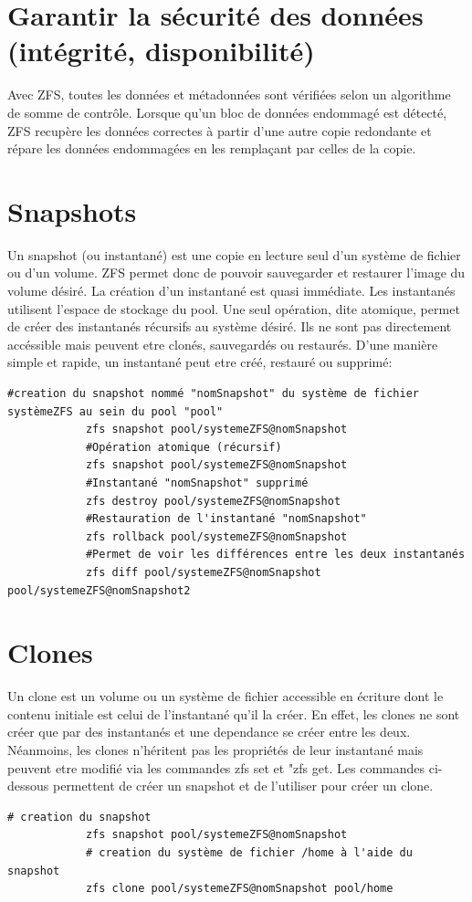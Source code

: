 \documentclass[a4paper]{report}
\begin{document}
	\section{Garantir la sécurité des données (intégrité, disponibilité)}
		Avec ZFS, toutes les données et métadonnées sont vérifiées selon un algorithme de somme de contrôle. Lorsque qu'un bloc de données endommagé est détecté, ZFS recupère les données correctes à partir d'une autre copie redondante et répare les données endommagées en les remplaçant par celles de la copie.
	\section{Snapshots}
		Un snapshot (ou instantané) est une copie en lecture seul d'un système de fichier ou d'un volume. ZFS permet donc de pouvoir sauvegarder et restaurer l'image du volume désiré. La création d'un instantané est quasi immédiate. Les instantanés utilisent l'espace de stockage du pool. Une seul opération, dite atomique, permet de créer des instantanés récursifs au système désiré. Ils ne sont pas directement accéssible mais peuvent etre clonés, sauvegardés ou restaurés. D'une manière simple et rapide, un instantané peut etre créé, restauré ou supprimé:
		\begin{lstlisting}[language=ksh,texcl]
			#creation du snapshot nommé "nomSnapshot" du système de fichier systèmeZFS au sein du pool "pool"
			zfs snapshot pool/systemeZFS@nomSnapshot
			#Opération atomique (récursif)
			zfs snapshot pool/systemeZFS@nomSnapshot 
			#Instantané "nomSnapshot" supprimé
			zfs destroy pool/systemeZFS@nomSnapshot 
			#Restauration de l'instantané "nomSnapshot"
			zfs rollback pool/systemeZFS@nomSnapshot 
			#Permet de voir les différences entre les deux instantanés
			zfs diff pool/systemeZFS@nomSnapshot pool/systemeZFS@nomSnapshot2 
		\end{lstlisting}
	\section{Clones}
		Un clone est un volume ou un système de fichier accessible en écriture dont le contenu initiale est celui de l'instantané qu'il la créer. En effet, les clones ne sont créer que par des instantanés et une dependance se créer entre les deux. Néanmoins, les clones n'héritent pas les propriétés de leur instantané mais peuvent etre modifié via les commandes zfs set et "zfs get. Les commandes ci-dessous permettent de créer un snapshot et de l'utiliser pour créer un clone.
		\begin{lstlisting}[language=ksh,texcl]
			# creation du snapshot
			zfs snapshot pool/systemeZFS@nomSnapshot 
			# creation du système de fichier /home à l'aide du snapshot
			zfs clone pool/systemeZFS@nomSnapshot pool/home 
		\end{lstlisting}
\end{document}
